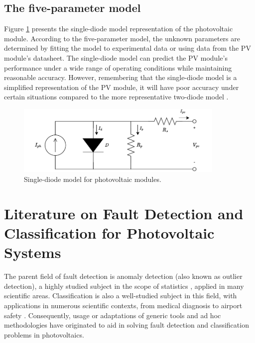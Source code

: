 \subsection{The five-parameter model}

Figure \ref{fig:onediodedraw} presents the single-diode model representation of the photovoltaic module. According to the five-parameter model, the unknown parameters are determined by fitting the model to experimental data or using data from the PV module's datasheet. The single-diode model can predict the PV module's performance under a wide range of operating conditions while maintaining reasonable accuracy. However, remembering that the single-diode model is a simplified representation of the PV module, it will have poor accuracy under certain situations compared to the more representative two-diode model \cite{Godina2017}.

\begin{figure}[h]
    \centering
    \includegraphics[width=10cm]{figures/chapter2/onediode.drawio.pdf} \caption{Single-diode model for photovoltaic modules.}
    \label{fig:onediodedraw}
\end{figure}

\section{Literature on Fault Detection and Classification for Photovoltaic Systems}

The parent field of fault detection is anomaly detection (also known as outlier detection), a highly studied subject in the scope of statistics \cite{Prasad2009}, applied in many scientific areas. Classification is also a well-studied subject in this field, with applications in numerous scientific contexts, from medical diagnosis to airport safety \cite{classification}. Consequently, usage or adaptations of generic tools and ad hoc methodologies have originated to aid in solving fault detection and classification problems in photovoltaics.

